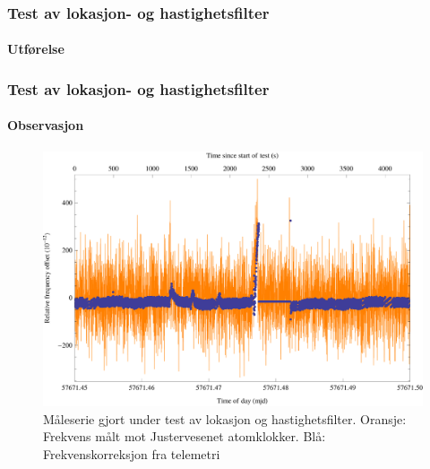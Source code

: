 \documentclass[xcolor=table]{beamer}
\begin{document}
\begin{frame}
\frametitle{Test av lokasjon- og hastighetsfilter}
\framesubtitle{Utførelse}
\begin{center}
\end{center}
\end{frame}

\begin{frame}
\frametitle{Test av lokasjon- og hastighetsfilter}
\framesubtitle{Observasjon}
      \begin{figure}
        \includegraphics[scale=0.70]{thesis/graphics/cns91-and-csac-telemetry-frequency-1.png}
        \caption{Måleserie gjort under test av lokasjon og hastighetsfilter. Oransje: Frekvens målt mot Justervesenet atomklokker. Blå: Frekvenskorreksjon fra telemetri}
      \end{figure}
\end{frame}
\end{document}
